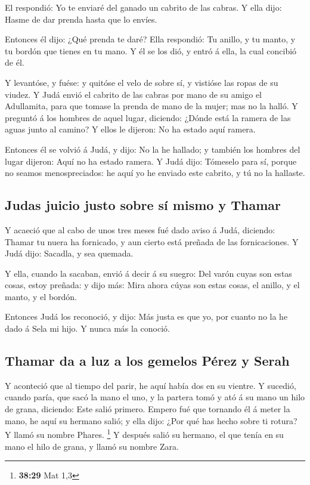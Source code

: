  El respondió: Yo te enviaré del ganado un cabrito de las
cabras. Y ella dijo: Hasme de dar prenda hasta que lo envíes.

 Entonces él dijo: ¿Qué prenda te daré? Ella respondió: Tu
anillo, y tu manto, y tu bordón que tienes en tu mano. Y él se los dió,
y entró á ella, la cual concibió de él.

 Y levantóse, y fuése: y quitóse el velo de sobre sí, y
vistióse las ropas de su viudez.  Y Judá envió el cabrito
de las cabras por mano de su amigo el Adullamita, para que tomase la
prenda de mano de la mujer; mas no la halló.  Y preguntó á
los hombres de aquel lugar, diciendo: ¿Dónde está la ramera de las aguas
junto al camino? Y ellos le dijeron: No ha estado aquí ramera.

 Entonces él se volvió á Judá, y dijo: No la he hallado; y
también los hombres del lugar dijeron: Aquí no ha estado ramera.
 Y Judá dijo: Tómeselo para sí, porque no seamos
menospreciados: he aquí yo he enviado este cabrito, y tú no la hallaste.

\hypertarget{judas-juicio-justo-sobre-suxed-mismo-y-thamar}{%
\subsection{Judas juicio justo sobre sí mismo y
Thamar}\label{judas-juicio-justo-sobre-suxed-mismo-y-thamar}}

 Y acaeció que al cabo de unos tres meses fué dado aviso á
Judá, diciendo: Thamar tu nuera ha fornicado, y aun cierto está preñada
de las fornicaciones. Y Judá dijo: Sacadla, y sea quemada.

 Y ella, cuando la sacaban, envió á decir á su suegro: Del
varón cuyas son estas cosas, estoy preñada: y dijo más: Mira ahora cúyas
son estas cosas, el anillo, y el manto, y el bordón.

 Entonces Judá los reconoció, y dijo: Más justa es que yo,
por cuanto no la he dado á Sela mi hijo. Y nunca más la conoció.

\hypertarget{thamar-da-a-luz-a-los-gemelos-puxe9rez-y-serah}{%
\subsection{Thamar da a luz a los gemelos Pérez y
Serah}\label{thamar-da-a-luz-a-los-gemelos-puxe9rez-y-serah}}

 Y aconteció que al tiempo del parir, he aquí había dos en
su vientre.  Y sucedió, cuando paría, que sacó la mano el
uno, y la partera tomó y ató á su mano un hilo de grana, diciendo: Este
salió primero.  Empero fué que tornando él á meter la mano,
he aquí su hermano salió; y ella dijo: ¿Por qué has hecho sobre ti
rotura? Y llamó su nombre Phares. \footnote{\textbf{38:29} Mat 1,3}
 Y después salió su hermano, el que tenía en su mano el
hilo de grana, y llamó su nombre Zara.

